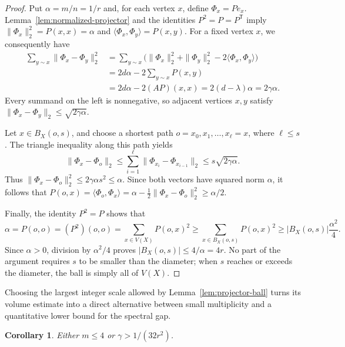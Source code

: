 \documentclass[11pt]{article}
\newtheorem{corollary}[theorem]{Corollary}
\theoremstyle{definition}
\theoremstyle{remark}
\begin{document}
\begin{proof}
Put $\alpha=m/n=1/r$ and, for each vertex $x$, define $\Phi_x=Pe_x$. Lemma~\ref{lem:normalized-projector} and the identities $P^2=P=P^{\mathsf T}$ imply $\|\Phi_x\|_2^2=P(x,x)=\alpha$ and $\langle\Phi_x,\Phi_y\rangle=P(x,y)$. For a fixed vertex $x$, we consequently have
\[
\begin{aligned}
\sum_{y\sim x}\|\Phi_x-\Phi_y\|_2^2
&=\sum_{y\sim x}\bigl(\|\Phi_x\|_2^2+\|\Phi_y\|_2^2-2\langle\Phi_x,\Phi_y\rangle\bigr)\\
&=2d\alpha-2\sum_{y\sim x}P(x,y)\\
&=2d\alpha-2(AP)(x,x)
=2(d-\lambda)\alpha
=2\gamma\alpha.
\end{aligned}
\]
Every summand on the left is nonnegative, so adjacent vertices $x,y$ satisfy $\|\Phi_x-\Phi_y\|_2\leq\sqrt{2\gamma\alpha}$.

Let $x\in B_X(o,s)$, and choose a shortest path $o=x_0,x_1,\ldots,x_\ell=x$, where $\ell\leq s$. The triangle inequality along this path yields
\[
\|\Phi_x-\Phi_o\|_2\leq\sum_{i=1}^{\ell}\|\Phi_{x_i}-\Phi_{x_{i-1}}\|_2\leq s\sqrt{2\gamma\alpha}.
\]
Thus $\|\Phi_x-\Phi_o\|_2^2\leq2\gamma\alpha s^2\leq\alpha$. Since both vectors have squared norm $\alpha$, it follows that $P(o,x)=\langle\Phi_o,\Phi_x\rangle=\alpha-\frac12\|\Phi_x-\Phi_o\|_2^2\geq\alpha/2$.

Finally, the identity $P^2=P$ shows that
\[
\alpha=P(o,o)=(P^2)(o,o)=\sum_{x\in V(X)}P(o,x)^2
\geq\sum_{x\in B_X(o,s)}P(o,x)^2
\geq|B_X(o,s)|\frac{\alpha^2}{4}.
\]
Since $\alpha>0$, division by $\alpha^2/4$ proves $|B_X(o,s)|\leq4/\alpha=4r$. No part of the argument requires $s$ to be smaller than the diameter; when $s$ reaches or exceeds the diameter, the ball is simply all of $V(X)$.
\end{proof}

Choosing the largest integer scale allowed by Lemma~\ref{lem:projector-ball} turns its volume estimate into a direct alternative between small multiplicity and a quantitative lower bound for the spectral gap.

\begin{corollary}\label{cor:gap-multiplicity-alternative}
Either $m\leq4$ or $\gamma>1/(32r^2)$.
\end{corollary}
\end{document}
